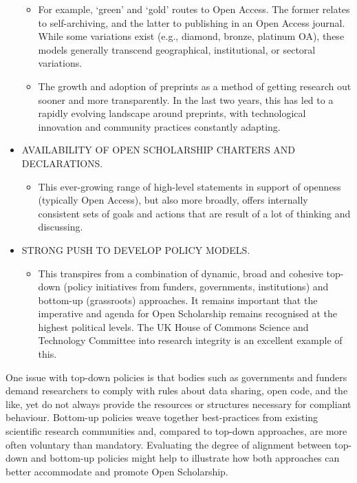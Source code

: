 \documentclass[]{article}
\providecommand{\tightlist}{%
  \setlength{\itemsep}{0pt}\setlength{\parskip}{0pt}}
\begin{document}
\begin{itemize}
  \begin{itemize}
  \item
    For example, `green' and `gold' routes to Open Access. The former
    relates to self-archiving, and the latter to publishing in an Open
    Access journal. While some variations exist (e.g., diamond, bronze,
    platinum OA), these models generally transcend geographical,
    institutional, or sectoral variations.
  \item
    The growth and adoption of preprints as a method of getting research
    out sooner and more transparently. In the last two years, this has
    led to a rapidly evolving landscape around preprints, with
    technological innovation and community practices constantly
    adapting.
  \end{itemize}
\item
  AVAILABILITY OF OPEN SCHOLARSHIP CHARTERS AND DECLARATIONS.

  \begin{itemize}
  \tightlist
  \item
    This ever-growing range of high-level statements in support of
    openness (typically Open Access), but also more broadly, offers
    internally consistent sets of goals and actions that are result of a
    lot of thinking and discussing.
  \end{itemize}
\item
  STRONG PUSH TO DEVELOP POLICY MODELS.

  \begin{itemize}
  \tightlist
  \item
    This transpires from a combination of dynamic, broad and cohesive
    top-down (policy initiatives from funders, governments,
    institutions) and bottom-up (grassroots) approaches. It remains
    important that the imperative and agenda for Open Scholarship
    remains recognised at the highest political levels. The UK House of
    Commons Science and Technology Committee into research integrity is
    an excellent example of this.
  \end{itemize}
\end{itemize}

One issue with top-down policies is that bodies such as governments and
funders demand researchers to comply with rules about data sharing, open
code, and the like, yet do not always provide the resources or
structures necessary for compliant behaviour. Bottom-up policies weave
together best-practices from existing scientific research communities
and, compared to top-down approaches, are more often voluntary than
mandatory. Evaluating the degree of alignment between top-down and
bottom-up policies might help to illustrate how both approaches can
better accommodate and promote Open Scholarship.
\end{document}
